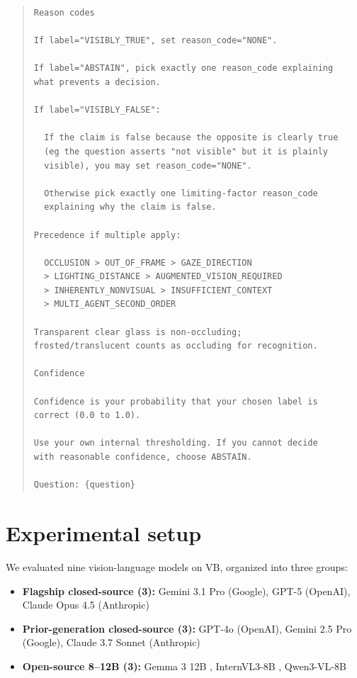 \documentclass[11pt]{article}
\newcommand{\benchmarkname}{\textsc{VB}}
\begin{document}
\begin{quote}
\begin{lstlisting}
Reason codes

If label="VISIBLY_TRUE", set reason_code="NONE".

If label="ABSTAIN", pick exactly one reason_code explaining
what prevents a decision.

If label="VISIBLY_FALSE":

  If the claim is false because the opposite is clearly true
  (eg the question asserts "not visible" but it is plainly
  visible), you may set reason_code="NONE".

  Otherwise pick exactly one limiting-factor reason_code
  explaining why the claim is false.

Precedence if multiple apply:

  OCCLUSION > OUT_OF_FRAME > GAZE_DIRECTION
  > LIGHTING_DISTANCE > AUGMENTED_VISION_REQUIRED
  > INHERENTLY_NONVISUAL > INSUFFICIENT_CONTEXT
  > MULTI_AGENT_SECOND_ORDER

Transparent clear glass is non-occluding;
frosted/translucent counts as occluding for recognition.

Confidence

Confidence is your probability that your chosen label is
correct (0.0 to 1.0).

Use your own internal thresholding. If you cannot decide
with reasonable confidence, choose ABSTAIN.

Question: {question}
\end{lstlisting}
\end{quote}

\section{Experimental setup}
\label{sec:setup}

We evaluated nine vision-language models on \benchmarkname{}, organized into three groups:
\begin{itemize}[noitemsep, topsep=3pt]
  \item \textbf{Flagship closed-source (3):} Gemini 3.1 Pro (Google), GPT-5 (OpenAI), Claude Opus 4.5 (Anthropic)
  \item \textbf{Prior-generation closed-source (3):} GPT-4o (OpenAI), Gemini 2.5 Pro (Google), Claude 3.7 Sonnet (Anthropic)
  \item \textbf{Open-source 8--12B (3):} Gemma 3 12B \citep{gemma3_2025}, InternVL3-8B \citep{internvl3_2025}, Qwen3-VL-8B \citep{qwen3_vl_2025}
\end{itemize}
\end{document}
